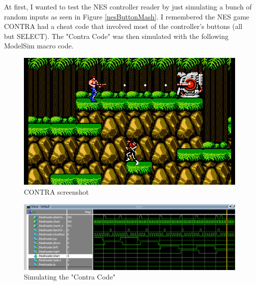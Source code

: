 \documentclass[a4paper]{article}
\begin{document}
At first, I wanted to test the NES controller reader by just simulating a bunch of random inputs as seen in Figure \ref{nesButtonMash}. I remembered the NES game CONTRA had a cheat code that involved most of the controller's buttons (all but SELECT). The "Contra Code" was then simulated with the following ModelSim macro code.
 
\begin{figure}[H]
    \includegraphics[width=0.8 \linewidth]{images/contra.jpg}
    \caption{CONTRA screenshot}
    \label{contra}
\end{figure}

\begin{figure}[H]
    \includegraphics[width=0.8 \linewidth]{images/NESSIMcontra.png}
    \caption{Simulating the "Contra Code" }
    \label{contraSim}
\end{figure}
\end{document}
